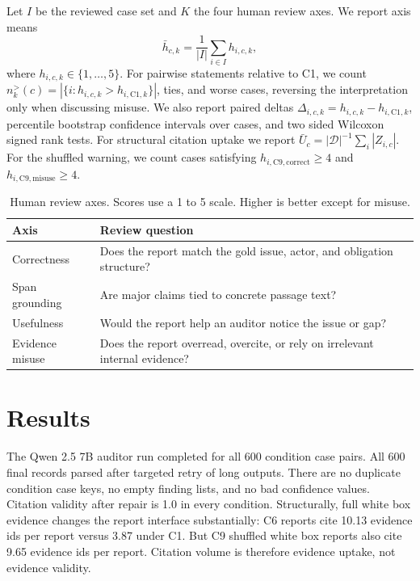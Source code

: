 \documentclass{article}
\newcommand{\dataset}{\mathcal{D}}
\begin{document}
Let $I$ be the reviewed case set and $K$ the four human review axes. We report axis means
\begin{equation}
\bar{h}_{c,k}=\frac{1}{|I|}\sum_{i\in I}h_{i,c,k},
\end{equation}
where $h_{i,c,k}\in\{1,\ldots,5\}$. For pairwise statements relative to C1, we count $n_k^{>}(c)=|\{i:h_{i,c,k}>h_{i,\mathrm{C1},k}\}|$, ties, and worse cases, reversing the interpretation only when discussing misuse. We also report paired deltas $\Delta_{i,c,k}=h_{i,c,k}-h_{i,\mathrm{C1},k}$, percentile bootstrap confidence intervals over cases, and two sided Wilcoxon signed rank tests. For structural citation uptake we report $\bar{U}_c=|\dataset|^{-1}\sum_i |Z_{i,c}|$. For the shuffled warning, we count cases satisfying $h_{i,\mathrm{C9},\mathrm{correct}}\geq4$ and $h_{i,\mathrm{C9},\mathrm{misuse}}\geq4$.

\begin{table}[H]
    \centering
    \caption{Human review axes. Scores use a 1 to 5 scale. Higher is better except for misuse.}
    \label{tab:review-axes}
    \scriptsize
    \setlength{\tabcolsep}{3pt}
    \begin{tabular}{@{}p{}p{}@{}}
        \toprule
        Axis & Review question \\
        \midrule
        Correctness & Does the report match the gold issue, actor, and obligation structure? \\
        Span grounding & Are major claims tied to concrete passage text? \\
        Usefulness & Would the report help an auditor notice the issue or gap? \\
        Evidence misuse & Does the report overread, overcite, or rely on irrelevant internal evidence? \\
        \bottomrule
    \end{tabular}
\end{table}

\FloatBarrier

\section{Results}

The Qwen 2.5 7B auditor run completed for all 600 condition case pairs. All 600 final records parsed after targeted retry of long outputs. There are no duplicate condition case keys, no empty finding lists, and no bad confidence values. Citation validity after repair is 1.0 in every condition. Structurally, full white box evidence changes the report interface substantially: C6 reports cite 10.13 evidence ids per report versus 3.87 under C1. But C9 shuffled white box reports also cite 9.65 evidence ids per report. Citation volume is therefore evidence uptake, not evidence validity.
\end{document}

